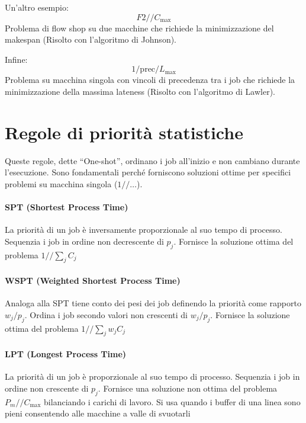\begin{example}
    Un'altro esempio:
    \[
        F2 / / C_{\max}
    \]
    Problema di flow shop su due macchine che richiede la minimizzazione del makespan (Risolto con l'algoritmo di Johnson).
\end{example}

\begin{example}
    Infine:
    \[
        1 / \text{prec} / L_{\max}
    \]
    Problema su macchina singola con vincoli di precedenza tra i job che richiede la minimizzazione della massima lateness (Risolto con l'algoritmo di Lawler).
\end{example}


%
\section{Regole di priorità statistiche}
Queste regole, dette ``One-shot'', ordinano i job all'inizio e non cambiano durante l'esecuzione. Sono fondamentali perché forniscono soluzioni ottime per specifici problemi su macchina singola ($ 1 / / \dots $).

%
\paragraph{SPT (Shortest Process Time)} La priorità di un job è inversamente proporzionale al suo tempo di processo. Sequenzia i job in ordine non decrescente di $ p_{j} $. Fornisce la soluzione ottima del problema $ 1 / / \sum_{j} C_{j} $
%
\paragraph{WSPT (Weighted Shortest Process Time)} Analoga alla SPT tiene conto dei pesi dei job definendo la priorità come rapporto $ w_{j} / p_{j} $. Ordina i job secondo valori non crescenti di $ w_{j} / p_{j} $. Fornisce la soluzione ottima del problema $ 1 / / \sum_{j} w_{j}C_{j} $

%
\paragraph{LPT (Longest Process Time)} La priorità di un job è proporzionale al suo tempo di processo. Sequenzia i job in ordine non crescente di $ p_{j} $. Fornisce una soluzione non ottima del problema $ P_{m} / / C_{\max} $ bilanciando i carichi di lavoro. Si usa quando i buffer di una linea sono pieni consentendo alle macchine a valle di svuotarli

